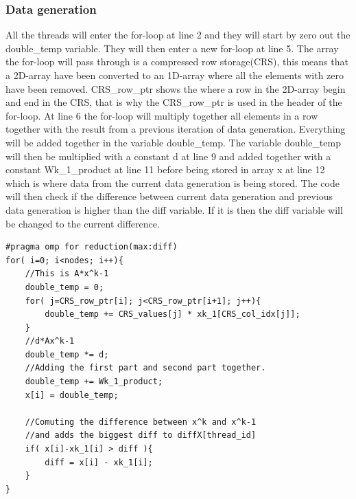 \documentclass[12pt,a4paper,USenglish]{article}      %
\begin{document}
\subsubsection{Data generation}
\label{sec:dramOnlyDatagen}

All the threads will enter the for-loop at line 2 and they will start by zero out the double\_temp variable. They will then enter a new for-loop at line 5.
The array the for-loop will pass through is a compressed row storage(CRS), this means that a 2D-array have been converted to an 1D-array where all the elements with zero have been removed. CRS\_row\_ptr shows the where a row in the 2D-array begin and end in the CRS, that is why the CRS\_row\_ptr is used in the header of the for-loop. At line 6 the for-loop will multiply together all elements in a row together with the result from a previous iteration of data generation. 
Everything will be added together in the variable double\_temp. The variable double\_temp will then be multiplied with a constant d at line 9 and added together with a constant Wk\_1\_product at line 11 before being stored in array x at line 12 which is where data from the current data generation is being stored.
The code will then check if the difference between current data generation and previous data generation is higher than the diff variable. If it is then the diff variable will be changed to the current difference.

\begin{lstlisting}[caption=Generation of data.]
#pragma omp for reduction(max:diff)
for( i=0; i<nodes; i++){
	//This is A*x^k-1
	double_temp = 0;
	for( j=CRS_row_ptr[i]; j<CRS_row_ptr[i+1]; j++){
		double_temp += CRS_values[j] * xk_1[CRS_col_idx[j]];
	}
	//d*Ax^k-1
	double_temp *= d;
	//Adding the first part and second part together.
	double_temp += Wk_1_product;
	x[i] = double_temp;

	//Comuting the difference between x^k and x^k-1
	//and adds the biggest diff to diffX[thread_id]
	if( x[i]-xk_1[i] > diff ){
		diff = x[i] - xk_1[i];
	}
}
\end{lstlisting}
\end{document}
